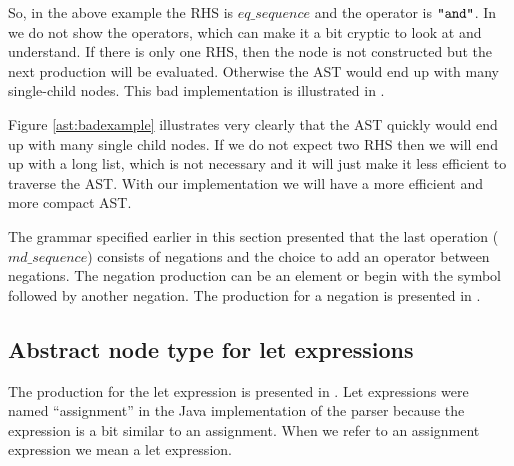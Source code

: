 


\begin{ebnf}
\end{ebnf}

So, in the above example the RHS is $eq\_sequence$ and the operator is
$\texttt{"and"}$. In  we do not show the operators, which can
make it a bit cryptic to look at and understand. If there is only one RHS, then
the node is not constructed but the next production will be evaluated. Otherwise
the AST would end up with many single-child nodes. This bad implementation is 
illustrated in .



Figure \ref{ast:badexample} illustrates very clearly that the AST quickly would
end up with many single child nodes. If we do not expect two RHS then we will 
end up with a long list, which is not necessary and it will just make it less 
efficient to traverse the AST. With our implementation we will have a more efficient 
and more compact AST.

The grammar specified earlier in this section presented that the last operation
($md\_sequence$) consists of negations and the choice to add an operator between
negations. The negation production can be an element or begin with the \gter{-}
symbol followed by another negation. The production for a negation is presented
in .


\subsection{Abstract node type for let expressions}
The production for the let expression is presented in
. Let expressions were named ``assignment'' in the
Java implementation of the parser because the expression is a bit similar to an
assignment. When we refer to an assignment expression we mean a let expression.


